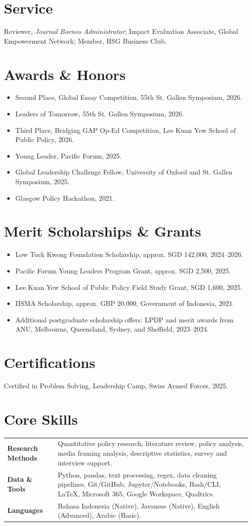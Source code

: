 \documentclass[10pt,a4paper]{article}
\newcommand{\cvsection}[1]{\section*{#1}}
\begin{document}
\cvsection{Service}
Reviewer, \textit{Journal Borneo Administrator}; Impact Evaluation Associate, Global Empowerment Network; Member, HSG Business Club.

\cvsection{Awards \& Honors}
\begin{itemize}
  \item Second Place, Global Essay Competition, 55th St. Gallen Symposium, 2026.
  \item Leaders of Tomorrow, 55th St. Gallen Symposium, 2026.
  \item Third Place, Bridging GAP Op-Ed Competition, Lee Kuan Yew School of Public Policy, 2026.
  \item Young Leader, Pacific Forum, 2025.
  \item Global Leadership Challenge Fellow, University of Oxford and St. Gallen Symposium, 2025.
  \item Glasgow Policy Hackathon, 2021.
\end{itemize}

\cvsection{Merit Scholarships \& Grants}
\begin{itemize}
  \item Low Tuck Kwong Foundation Scholarship, approx. SGD 142,000, 2024--2026.
  \item Pacific Forum Young Leaders Program Grant, approx. SGD 2,500, 2025.
  \item Lee Kuan Yew School of Public Policy Field Study Grant, SGD 1,600, 2025.
  \item IISMA Scholarship, approx. GBP 20,000, Government of Indonesia, 2021.
  \item Additional postgraduate scholarship offers: LPDP and merit awards from ANU, Melbourne, Queensland, Sydney, and Sheffield, 2023--2024.
\end{itemize}

\cvsection{Certifications}
Certified in Problem Solving, Leadership Camp, Swiss Armed Forces, 2025.

\cvsection{Core Skills}
\begin{tabularx}{\textwidth}{@{}p{}X@{}}
\textbf{Research Methods} & Quantitative policy research, literature review, policy analysis, media framing analysis, descriptive statistics, survey and interview support.\\
\textbf{Data \& Tools} & Python, pandas, text processing, regex, data cleaning pipelines, Git/GitHub, Jupyter/Notebooks, Bash/CLI, LaTeX, Microsoft 365, Google Workspace, Qualtrics.\\
\textbf{Languages} & Bahasa Indonesia (Native), Javanese (Native), English (Advanced), Arabic (Basic).
\end{tabularx}
\end{document}
